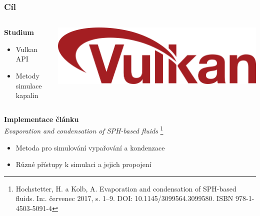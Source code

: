 \documentclass[10pt,xcolor=pdflatex,hyperref={unicode},aspectratio=169]{beamer}
\begin{document}
\begin{frame}\frametitle{Cíl}
    \begin{columns}
        \hspace{.4cm}
        \begin{column}{0.5\textwidth}
            \textbf{Studium}
            \begin{itemize}
                \item Vulkan API
                \item Metody simulace kapalin
            \end{itemize}
        \end{column}
        \begin{column}{0.5\textwidth}
            \includegraphics[scale=0.2]{img/Vulkan.png}
        \end{column}
    \end{columns}
    
    \bigbreak
    \bigbreak
    
    \textbf{Implementace článku} \\
    \textit{Evaporation and condensation of SPH-based fluids} \footnote{Hochstetter, H. a Kolb, A. Evaporation and condensation of SPH-based fluids. In:. červenec 2017, s. 1–9. DOI: 10.1145/3099564.3099580. ISBN 978-1-4503-5091-4}
    \begin{itemize}
        \item Metoda pro simulování vypařování a kondenzace
        \item Různé přístupy k simulaci a jejich propojení
    \end{itemize}

\end{frame}

\end{document}
